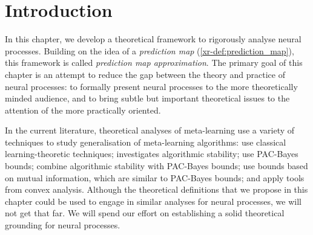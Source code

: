 \documentclass[12pt, twoside]{report}
\newcommand{\xrprefix}[1]{xr-#1}
\begin{document}
\section{Introduction}
\label{sec:predmap:motivation}

In this chapter, we develop a theoretical framework to rigorously analyse neural processes. 
Building on the idea of a \emph{prediction map} (\cref{\xrprefix{def:prediction_map}}),
this framework is called \emph{prediction map approximation}.
The primary goal of this chapter is an attempt to reduce the gap between the theory and practice of neural processes:
to formally present neural processes to the more theoretically minded audience, and to bring subtle but important theoretical issues to the attention of the more practically oriented.

In the current literature, theoretical analyses of meta-learning use a variety of techniques to study generalisation of meta-learning algorithms:
\textcite{Baxter:1998:Theoretical_Models_of_Learning_to_Learn,
Baxter:2000:A_Model_of_Inductive_Bias_Learning}
use classical learning-theoretic techniques;
\textcite{Maurer:2005:Algorithmic_Stability_and_Meta-Learning}
investigates algorithmic stability;
\textcite{Pentina:2014:A_PAC-Bayesian_Bound_for_Lifelong,
Alquier:2017:Regret_Bounds_for_Lifelong_Learning,
Amit:2018:Meta-Learning_by_Adjusting_Priors_Based,
Yin:2020:Meta-Learning_Without_Memorization,
Liu:2021:PAC-Bayes_Bounds_for_Meta-Learning_With,
Rothfuss:2021:PACOH_Bayes-Optimal_Meta-Learning_With_PAC-Guarantees}
use PAC-Bayes bounds;
\textcite{Farid:2021:Generalization_Bounds_for_Meta-Learning_via}
combine algorithmic stability with PAC-Bayes bounds;
\textcite{Jose:2021:Information-Theoretic_Generalization_Bounds_for_Meta-Learning,
Chen:2021:Generalization_Bounds_for_Meta-Learning_An,
Rezazadeh:2021:Conditional_Mutual_Information-Based_Generalization_Bound}
use bounds based on mutual information, which are similar to PAC-Bayes bounds; and
\textcite{Khodak:2019:Provable_Guarantees_for_Gradient-Based_Meta-Learning,
Denevi:2019:Online-Within-Online_Meta-Learning}
apply tools from convex analysis.
Although the theoretical definitions that we propose in this chapter could be used to engage in similar analyses for neural processes,
we will not get that far.
We will spend our effort on establishing a solid theoretical grounding for neural processes.
\end{document}
